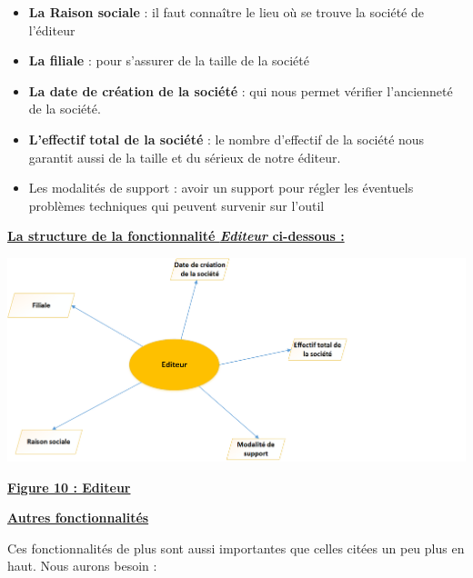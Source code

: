 \documentclass[11pt]{report}
\begin{document}
\begin{itemize}
	\item \textbf{La Raison sociale} : il faut connaître le lieu où se trouve la société de l’éditeur

	\item \textbf{La filiale} : pour s’assurer de la taille de la société

	\item\textbf{ La date de création de la société} : qui nous permet vérifier l’ancienneté de la société.

	\item \textbf{L’effectif total de la société} : le nombre d’effectif de la société nous garantit aussi de la taille et du sérieux de notre éditeur.

	\item Les modalités de support : avoir un support pour régler les éventuels problèmes techniques qui peuvent survenir sur l’outil
\end{itemize}

\newpage
\begin{center}
\underline{\textbf{La structure de la fonctionnalité \textit{Editeur} ci-dessous :}}
\end{center}

\begin{center}
\includegraphics[scale=0.7]{images/figure10.png} 
\quad

\underline{\textbf{Figure 10 : Editeur}}
\end{center}
\quad

\begin{center}
\underline{\textbf{Autres fonctionnalités}} 
\end{center}

\hspace{1cm} Ces fonctionnalités de plus sont aussi importantes que celles citées un peu plus en haut. Nous aurons besoin :
\end{document}
